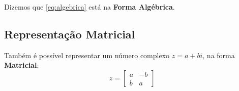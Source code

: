 Dizemos que \eqref{eq:algebrica} está na \textbf{Forma Algébrica}. 

\subsection{Representação Matricial} %

Também é possível representar um número complexo $ z = a + bi $, na forma 
\textbf{Matricial}: 
\[
  z = 
  \begin{bmatrix}
    a & -b \\
    b &  a
  \end{bmatrix}
\]

